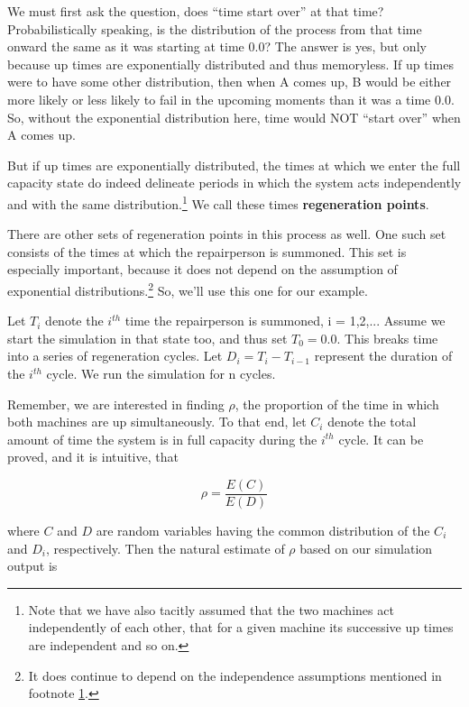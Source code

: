 We must first ask the question, does ``time start over'' at that time?
Probabilistically speaking, is the distribution of the process from that
time onward the same as it was starting at time 0.0?  The answer is yes,
but only because up times are exponentially distributed and thus
memoryless.  If up times were to have some other distribution, then when
A comes up, B would be either more likely or less likely to fail in the
upcoming moments than it was a time 0.0.  So, without the exponential
distribution here, time would NOT ``start over'' when A comes up.

But if up times are exponentially distributed, the times at which we
enter the full capacity state do indeed delineate periods in which the
system acts independently and with the same
distribution.\footnote{\label{indp}Note that we have also tacitly
assumed that the two machines act independently of each other, that for
a given machine its successive up times are independent and so on.} We
call these times {\bf regeneration points}.

There are other sets of regeneration points in this process as well.
One such set consists of the times at which the repairperson is
summoned.  This set is especially important, because it does not depend
on the assumption of exponential distributions.\footnote{It does
continue to depend on the independence assumptions mentioned in footnote
\ref{indp}.} So, we'll use this one for our example.

Let $T_i$ denote the $i^{th}$ time the repairperson is summoned, i =
1,2,...  Assume we start the simulation in that state too, and thus set
$T_0 = 0.0$.  This breaks time into a series of regeneration cycles.
Let $D_i = T_i - T_{i-1}$ represent the duration of the $i^{th}$ cycle.
We run the simulation for n cycles.

Remember, we are interested in finding $\rho$, the proportion of the
time in which both machines are up simultaneously.  To that end, 
let $C_i$ denote the total amount of time the system is in full capacity
during the $i^{th}$ cycle.  It can be proved, and it is intuitive, that 

\begin{equation}
\label{iglehart}
\rho = \frac{E(C)}{E(D)}
\end{equation}

where $C$ and $D$ are random variables having the common distribution of
the $C_i$ and $D_i$, respectively.  Then the natural estimate of $\rho$
based on our simulation output is

